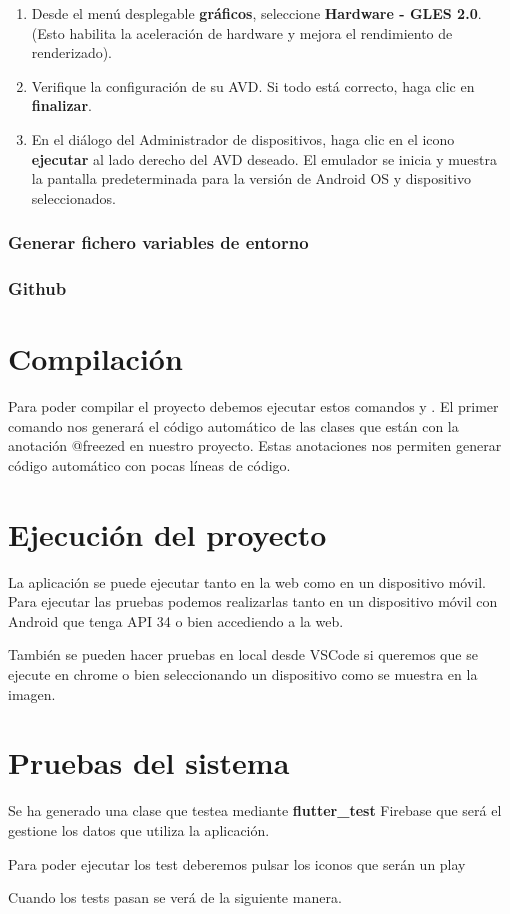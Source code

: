 \begin{enumerate}
	\item Desde el menú desplegable \textbf{gráficos}, seleccione \textbf{Hardware - GLES 2.0}. (Esto habilita la aceleración de hardware y mejora el rendimiento de renderizado).
	\item Verifique la configuración de su AVD. Si todo está correcto, haga clic en \textbf{finalizar}.
	\item En el diálogo del Administrador de dispositivos, haga clic en el icono \textbf{ejecutar} al lado derecho del AVD deseado. El emulador se inicia y muestra la pantalla predeterminada para la versión de Android OS y dispositivo seleccionados.
\end{enumerate}

\subsubsection{Generar fichero variables de entorno}

\subsubsection{Github}

\section{Compilación}
Para poder compilar el proyecto debemos ejecutar estos comandos \fboxrule=1pt\fboxsep=4pt y \fboxrule=1pt\fboxsep=4pt. El primer comando nos generará el código automático de las clases que están con la anotación @freezed en nuestro proyecto. Estas anotaciones nos permiten generar código automático con pocas líneas de código.

\section{Ejecución del proyecto}
La aplicación se puede ejecutar tanto en la web como en un dispositivo móvil. Para ejecutar las pruebas podemos realizarlas tanto en un dispositivo móvil con Android que tenga API 34 o bien accediendo a la web.

También se pueden hacer pruebas en local desde VSCode \fboxrule=1pt\fboxsep=4pt si queremos que se ejecute en chrome o bien seleccionando un dispositivo como se muestra en la imagen.

\section{Pruebas del sistema}
Se ha generado una clase que testea mediante \textbf{flutter\_test} Firebase que será el gestione los datos que utiliza la aplicación.

Para poder ejecutar los test deberemos pulsar los iconos que serán un play

Cuando los tests pasan se verá de la siguiente manera.
